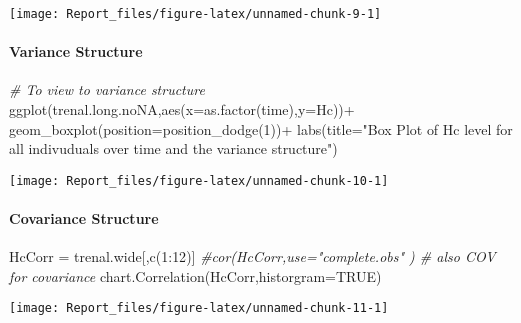 \documentclass[
]{article}
\newenvironment{Shaded}{\begin{snugshade}}{\end{snugshade}}
\newcommand{\AttributeTok}[1]{\textcolor[rgb]{0.77,0.63,0.00}{#1}}
\newcommand{\CommentTok}[1]{\textcolor[rgb]{0.56,0.35,0.01}{\textit{#1}}}
\newcommand{\ConstantTok}[1]{\textcolor[rgb]{0.00,0.00,0.00}{#1}}
\newcommand{\DecValTok}[1]{\textcolor[rgb]{0.00,0.00,0.81}{#1}}
\newcommand{\FunctionTok}[1]{\textcolor[rgb]{0.00,0.00,0.00}{#1}}
\newcommand{\NormalTok}[1]{#1}
\newcommand{\OtherTok}[1]{\textcolor[rgb]{0.56,0.35,0.01}{#1}}
\newcommand{\SpecialCharTok}[1]{\textcolor[rgb]{0.00,0.00,0.00}{#1}}
\newcommand{\StringTok}[1]{\textcolor[rgb]{0.31,0.60,0.02}{#1}}
\begin{document}
\begin{center}\texttt{[image: Report\_files/figure-latex/unnamed-chunk-9-1]} \end{center}

\hypertarget{variance-structure}{%
\paragraph{Variance Structure}\label{variance-structure}}

\begin{Shaded}
\begin{Highlighting}[]
\CommentTok{\# To view to variance structure}
\FunctionTok{ggplot}\NormalTok{(trenal.long.noNA,}\FunctionTok{aes}\NormalTok{(}\AttributeTok{x=}\FunctionTok{as.factor}\NormalTok{(time),}\AttributeTok{y=}\NormalTok{Hc))}\SpecialCharTok{+} 
  \FunctionTok{geom\_boxplot}\NormalTok{(}\AttributeTok{position=}\FunctionTok{position\_dodge}\NormalTok{(}\DecValTok{1}\NormalTok{))}\SpecialCharTok{+}
  \FunctionTok{labs}\NormalTok{(}\AttributeTok{title=}\StringTok{"Box Plot of Hc level for all indivuduals over time and the variance structure"}\NormalTok{)}
\end{Highlighting}
\end{Shaded}

\begin{center}\texttt{[image: Report\_files/figure-latex/unnamed-chunk-10-1]} \end{center}

\hypertarget{covariance-structure}{%
\paragraph{Covariance Structure}\label{covariance-structure}}

\begin{Shaded}
\begin{Highlighting}[]
\NormalTok{HcCorr }\OtherTok{=}\NormalTok{ trenal.wide[,}\FunctionTok{c}\NormalTok{(}\DecValTok{1}\SpecialCharTok{:}\DecValTok{12}\NormalTok{)]}
\CommentTok{\#cor(HcCorr,use="complete.obs" ) \# also COV for covariance}
\FunctionTok{chart.Correlation}\NormalTok{(HcCorr,}\AttributeTok{historgram=}\ConstantTok{TRUE}\NormalTok{)}
\end{Highlighting}
\end{Shaded}

\begin{center}\texttt{[image: Report\_files/figure-latex/unnamed-chunk-11-1]} \end{center}
\end{document}
